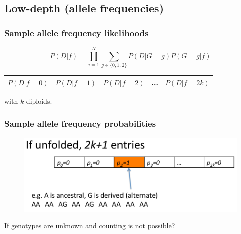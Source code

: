 
\subsection{Low-depth (allele frequencies)}


\begin{frame}
\frametitle{Sample allele frequency likelihoods}

        \begin{equation*}
                        P(D|f) = \prod_{i=1}^N \sum_{g \in \{0,1,2\}} P(D|G=g) P(G=g|f)
        \end{equation*}

	\begin{center}
                \begin{tabular}{| c | c | c | c | c |}
			\hline
			$P(D|f=0)$ & $P(D|f=1)$ & $P(D|f=2)$ & ... & $P(D|f=2k)$\\
			\hline
                \end{tabular}
                with $k$ diploids.
        \end{center}

\end{frame}


\begin{frame}
\frametitle{Sample allele frequency probabilities}

	\begin{figure}
                \includegraphics[width=\textwidth]{Pics/saf_1.png}
        \end{figure}
	
	If genotypes are unknown and counting is not possible?

\end{frame}


